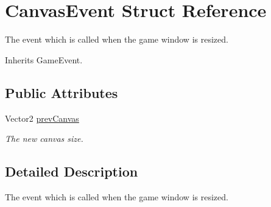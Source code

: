 \hypertarget{struct_canvas_event}{\section{Canvas\-Event Struct Reference}
\label{struct_canvas_event}
}


The event which is called when the game window is resized.  




Inherits Game\-Event.

\subsection*{Public Attributes}
\begin{DoxyCompactItemize}
\item 
\hypertarget{struct_canvas_event_a421c4ec31c11f925212537e8c86dc6e0}{Vector2 \hyperlink{struct_canvas_event_a421c4ec31c11f925212537e8c86dc6e0}{prev\-Canvas}}\label{struct_canvas_event_a421c4ec31c11f925212537e8c86dc6e0}

\begin{DoxyCompactList}\small\item\em The new canvas size. \end{DoxyCompactList}\end{DoxyCompactItemize}


\subsection{Detailed Description}
The event which is called when the game window is resized. 

